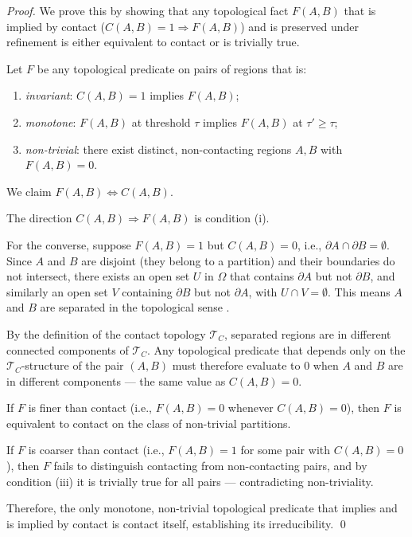 \documentclass[twocolumn]{article}
\theoremstyle{plain}
\theoremstyle{definition}
\newcommand{\TC}{\mathcal{T}_C}
\begin{document}
\begin{proof}
We prove this by showing that any topological fact $F(A,B)$ that is implied by
contact ($C(A,B) = 1 \Rightarrow F(A,B)$) and is preserved under refinement is
either equivalent to contact or is trivially true.

Let $F$ be any topological predicate on pairs of regions that is:
\begin{enumerate}[label=(\roman*)]
\item \emph{invariant}: $C(A,B) = 1$ implies $F(A,B)$;
\item \emph{monotone}: $F(A,B)$ at threshold $\tau$ implies $F(A,B)$ at $\tau' \geq \tau$;
\item \emph{non-trivial}: there exist distinct, non-contacting regions $A, B$ with $F(A,B) = 0$.
\end{enumerate}

We claim $F(A,B) \Leftrightarrow C(A,B)$.

The direction $C(A,B) \Rightarrow F(A,B)$ is condition (i).

For the converse, suppose $F(A,B) = 1$ but $C(A,B) = 0$, i.e., $\partial A \cap
\partial B = \emptyset$. Since $A$ and $B$ are disjoint (they belong to a
partition) and their boundaries do not intersect, there exists an open set $U$
in $\Omega$ that contains $\partial A$ but not $\partial B$, and similarly an
open set $V$ containing $\partial B$ but not $\partial A$, with $U \cap V = \emptyset$.
This means $A$ and $B$ are separated in the topological sense \cite{munkres2000topology}.

By the definition of the contact topology $\TC$, separated regions are in
different connected components of $\TC$. Any topological predicate that depends
only on the $\TC$-structure of the pair $(A,B)$ must therefore evaluate to $0$
when $A$ and $B$ are in different components --- the same value as $C(A,B) = 0$.

If $F$ is finer than contact (i.e., $F(A,B) = 0$ whenever $C(A,B) = 0$), then
$F$ is equivalent to contact on the class of non-trivial partitions.

If $F$ is coarser than contact (i.e., $F(A,B) = 1$ for some pair with $C(A,B) = 0$),
then $F$ fails to distinguish contacting from non-contacting pairs, and by
condition (iii) it is trivially true for all pairs --- contradicting non-triviality.

Therefore, the only monotone, non-trivial topological predicate that implies and
is implied by contact is contact itself, establishing its irreducibility. \qed
\end{proof}
\end{document}
